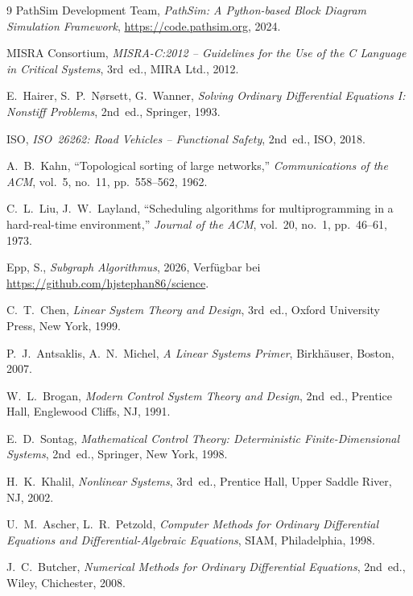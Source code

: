 ﻿\documentclass[12pt,a4paper]{article}
\theoremstyle{definition}
\begin{document}
\begin{thebibliography}{9}
  PathSim Development Team,
  \emph{PathSim: A Python-based Block Diagram Simulation Framework},
  \url{https://code.pathsim.org}, 2024.

  MISRA Consortium,
  \emph{MISRA-C:2012 -- Guidelines for the Use of the C Language in Critical Systems},
  3rd~ed., MIRA Ltd., 2012.

  E.~Hairer, S.~P.~N{\o}rsett, G.~Wanner,
  \emph{Solving Ordinary Differential Equations I: Nonstiff Problems},
  2nd~ed., Springer, 1993.

  ISO,
  \emph{ISO~26262: Road Vehicles -- Functional Safety},
  2nd~ed., ISO, 2018.

  A.~B.~Kahn,
  ``Topological sorting of large networks,''
  \emph{Communications of the ACM}, vol.~5, no.~11, pp.~558--562, 1962.

  C.~L.~Liu, J.~W.~Layland,
  ``Scheduling algorithms for multiprogramming in a hard-real-time environment,''
  \emph{Journal of the ACM}, vol.~20, no.~1, pp.~46--61, 1973.

Epp, S.,
\textit{Subgraph Algorithmus},
2026, Verfügbar bei \url{https://github.com/hjstephan86/science}.

  C.~T.~Chen,
  \emph{Linear System Theory and Design},
  3rd~ed., Oxford University Press, New York, 1999.

  P.~J.~Antsaklis, A.~N.~Michel,
  \emph{A Linear Systems Primer},
  Birkhäuser, Boston, 2007.

  W.~L.~Brogan,
  \emph{Modern Control System Theory and Design},
  2nd~ed., Prentice Hall, Englewood Cliffs, NJ, 1991.

  E.~D.~Sontag,
  \emph{Mathematical Control Theory: Deterministic Finite-Dimensional Systems},
  2nd~ed., Springer, New York, 1998.

  H.~K.~Khalil,
  \emph{Nonlinear Systems},
  3rd~ed., Prentice Hall, Upper Saddle River, NJ, 2002.

  U.~M.~Ascher, L.~R.~Petzold,
  \emph{Computer Methods for Ordinary Differential Equations and Differential-Algebraic Equations},
  SIAM, Philadelphia, 1998.

  J.~C.~Butcher,
  \emph{Numerical Methods for Ordinary Differential Equations},
  2nd~ed., Wiley, Chichester, 2008.


\end{thebibliography}
\end{document}
